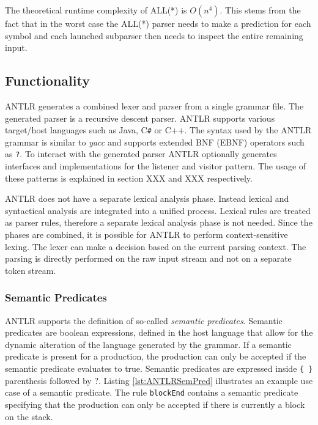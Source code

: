 The theoretical runtime complexity of ALL(*) is $O(n^4)$. This stems from the fact that in the worst case the ALL(*) parser needs to make a prediction for each symbol and each launched subparser then needs to inspect the entire remaining input. 


\subsection{Functionality}

ANTLR generates a combined lexer and parser from a single grammar file. The generated parser is a recursive descent parser. ANTLR supports various target/host languages such as Java, C\verb|#| or C++. The syntax used by the ANTLR grammar is similar to \textit{yacc} and supports extended BNF (EBNF) operators such as \texttt{?}. To interact with the generated parser ANTLR optionally generates interfaces and implementations for the listener and visitor pattern. The usage of these patterns is explained in section XXX and XXX respectively.

ANTLR does not have a separate lexical analysis phase. Instead lexical and syntactical analysis are integrated into a unified process. Lexical rules are treated as parser rules, therefore a separate lexical analysis phase is not needed. Since the phases are combined, it is possible for ANTLR to perform context-sensitive lexing. The lexer can make a decision based on the current parsing context. The parsing is directly performed on the raw input stream and not on a separate token stream. 

\subsubsection{Semantic Predicates}

ANTLR supports the definition of so-called \textit{semantic predicates}. Semantic predicates are boolean expressions, defined in the host language that allow for the dynamic alteration of the language generated by the grammar. If a semantic predicate is present for a production, the production can only be accepted if the semantic predicate evaluates to true. Semantic predicates are expressed inside \verb|{ }| parenthesis followed by $?$. Listing \ref{lst:ANTLRSemPred} illustrates an example use case of a semantic predicate. The rule \texttt{blockEnd} contains a semantic predicate specifying that the production can only be accepted if there is currently a block on the stack. 


